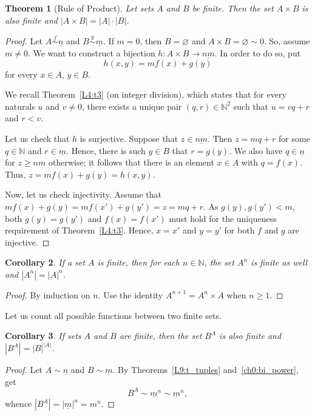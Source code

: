 \documentclass[12pt,notitlepage]{article}
\theoremstyle{plain}
\newtheorem{thm}{Theorem}[section]
\newtheorem{corr}[thm]{Corollary}
\theoremstyle{definition}
\theoremstyle{plain}
\newcommand{\N}{\mathbb{N}}
\newcommand{\void}{\varnothing}
\newcommand{\ul}[1]{\underline{#1}}
\newcommand{\1}{\mathbf{1}}
\newcommand{\0}{\mathbf{0}}
\begin{document}
\begin{thm}[Rule of Product]\label{prod}
Let sets $A$ and $B$ be finite. Then the set $A \times B$ is also finite and $|A \times B| = |A| \cdot |B|$.
\end{thm}
\begin{proof}
Let $A \stackrel{f}{\sim} \ul{n}$ and $B \stackrel{g}{\sim} \ul{m}$. If $m = 0$, then $B = \void$ and $A \times B = \void \sim \ul{0}$. So, assume $m \neq 0$. We want to construct a bijection $h\colon A \times B \to \ul{nm}$. In order to do so, put
$$h(x, y) = mf(x) + g(y)$$
for every $x \in A$, $y\in B$.

We recall Theorem~\ref{L4:t3} (on integer division), which states that for every naturals $u$ and $v \neq 0$, there exists a unique pair  $(q,r) \in \N^2$ such that $u = vq + r$ and $r < v$.

Let us check that $h$ is surjective. Suppose that $z \in \ul{nm}$. Then $z = mq + r$ for some $q \in \N$ and $r \in \ul{m}$. Hence, there is such $y \in B$ that $r = g(y)$. We also have $q \in \ul{n}$ for $z \geq nm$ otherwise; it follows that there is an element $x \in A$ with $q = f(x)$. Thus, $z = mf(x) + g(y) = h(x, y)$.

Now, let us check injectivity. Assume that $mf(x) + g(y) = mf(x') + g(y') = z = mq + r$. As $g(y), g(y') < m$, both $g(y) =  g(y')$ and $f(x) = f(x')$ must hold for the uniqueness requirement of Theorem~\ref{L4:t3}. Hence, $x = x'$ and $y = y'$ for both $f$ and $g$ are injective.
\end{proof}

\begin{corr}\label{L10:num_tuple}
If a set $A$ is finite, then for each $n \in \N$, the set $A^n$ is finite as well and $|A^n| = |A|^n$.
\end{corr}
\begin{proof}
By induction on $n$. Use the identity $A^{n+1} = A^n \times A$ when $n \geq 1$.
\end{proof}

Let us count all possible functions between two finite sets.
\begin{corr}\label{L10:num_func}
If sets $A$ and $B$ are finite, then the set $B^A$ is also finite and $|B^A| = |B|^{|A|}$.
\end{corr}
\begin{proof}
Let $A \sim \ul{n}$ and $B \sim \ul{m}$. By Theorems~\ref{L9:t_tuples} and~\ref{ch0:bi_power}, get
$$B^A \sim \ul{m}^{\ul{n}} \sim \ul{m}^n,$$
whence $|B^A| = |\ul{m}|^n = m^n$.
\end{proof}
\end{document}
